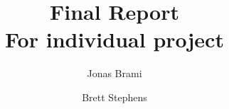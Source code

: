 \begin{frontmatter}
%
\title{%
Final Report\\
\small For individual project  %
}
%
\author{Jonas Brami} 
\author{Brett Stephens}

%
%
\renewcommand*{\today}{\DayMonthYearDateFormat\displaydate{dateName}} 
%
%
\end{frontmatter}
%
%

\ 
\vspace{1cm}

\begin{minipage}{\textwidth}
    \tableofcontents
\end{minipage}
\clearpage